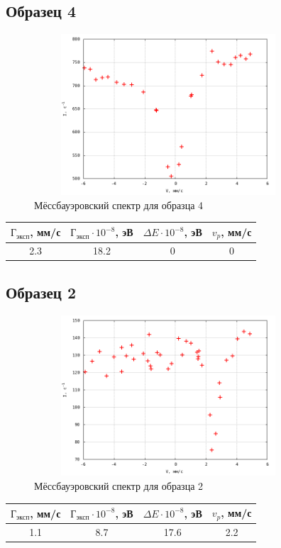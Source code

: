 \documentclass[12pt]{article}
\begin{document}
\subsection*{Образец 4}
	\begin{figure}[h!]
	\centering
	\includegraphics[width = 10cm, height=6cm]{plot3.png}
	\caption{Мёссбауэровский спектр для образца 4}
\end{figure}
\newpage
\par
	\begin{table}[h!]
		\centering
		\begin{tabular}{|c|c|c|c|}
		\hline
			$\text{Г}_\text{эксп}$, мм/с & $\text{Г}_\text{эксп} \cdot 10^{-8}$, эВ & $\Delta E \cdot 10^{-8}$, эВ & $v_p$, мм/с \\
		\hline
			2.3 & 18.2 & 0 & 0 \\
		\hline
		\end{tabular}
	\end{table}
\subsection*{Образец 2}
	\begin{figure}[h!]
	\centering
	\includegraphics[width = 10cm, height=6cm]{plot4.png}
	\caption{Мёссбауэровский спектр для образца 2}
\end{figure}
\par
	\begin{table}[h!]
		\centering
		\begin{tabular}{|c|c|c|c|}
		\hline
			$\text{Г}_\text{эксп}$, мм/с & $\text{Г}_\text{эксп} \cdot 10^{-8}$, эВ & $\Delta E \cdot 10^{-8}$, эВ & $v_p$, мм/с \\
		\hline
			1.1 & 8.7 & 17.6 & 2.2 \\
		\hline
		\end{tabular}
	\end{table}
\end{document}
